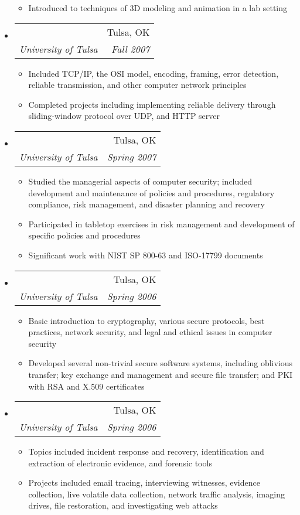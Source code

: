 \documentclass[letterpaper,11pt]{article}
\makeatletter
\newcommand{\resitem}[1]{\item #1 \vspace{-2pt}}
\newcommand{\ressubheading}[4]{
\begin{tabular*}{6.5in}{l@{\extracolsep{\fill}}r}
		\textbf{\parbox{5in}{\raggedright #1 }} & #2 \\
		\textit{#3} & \textit{#4} \\
\end{tabular*}\vspace{-6pt}}
\makeatother
\begin{document}
\begin{itemize}
	\begin{itemize}
		\resitem{Introduced to techniques of 3D modeling and animation in a lab setting}
	\end{itemize}
\item
	\ressubheading{Computer Networks}{Tulsa, OK}{University of Tulsa}{Fall 2007}
	\begin{itemize}
		\resitem{Included TCP/IP, the OSI model, encoding, framing, error detection, reliable transmission, and other computer network principles}
		\resitem{Completed projects including implementing reliable delivery through sliding-window protocol over UDP, and HTTP server}
	\end{itemize}
\item
	\ressubheading{Enterprise Security Management}{Tulsa, OK}{University of Tulsa}{Spring 2007}
	\begin{itemize}
		\resitem{Studied the managerial aspects of computer security; included development and maintenance of policies and procedures, regulatory compliance, risk management, and disaster planning and recovery}
		\resitem{Participated in tabletop exercises in risk management and development of specific policies and procedures}
		\resitem{Significant work with NIST SP 800-63 and ISO-17799 documents}
	\end{itemize}
\item
	\ressubheading{Computer Security}{Tulsa, OK}{University of Tulsa}{Spring 2006}
	\begin{itemize}
		\resitem{Basic introduction to cryptography, various secure protocols, best practices, network security, and legal and ethical issues in computer security}
		\resitem{Developed several non-trivial secure software systems, including oblivious transfer; key exchange and management and secure file transfer; and PKI with RSA and X.509 certificates}
	\end{itemize}
\item
	\ressubheading{Computer Forensics}{Tulsa, OK}{University of Tulsa}{Spring 2006}
	\begin{itemize}
		\resitem{Topics included incident response and recovery, identification and extraction of electronic evidence, and forensic tools}
		\resitem{Projects included email tracing, interviewing witnesses, evidence collection, live volatile data collection, network traffic analysis, imaging drives, file restoration, and investigating web attacks}
	\end{itemize}
\end{itemize}
\end{document}
